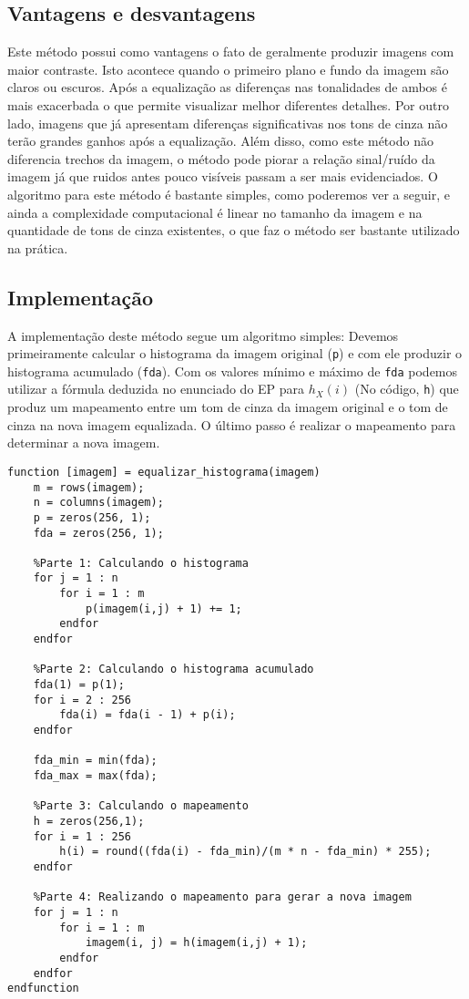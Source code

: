\documentclass[brazil,times]{abnt}
\begin{document}
		\subsection{Vantagens e desvantagens}
			Este método possui como vantagens o fato de geralmente produzir imagens com maior contraste. Isto acontece quando o primeiro plano e fundo da imagem são claros ou escuros. Após a equalização as diferenças nas tonalidades de ambos é mais exacerbada o que permite visualizar melhor diferentes detalhes. Por outro lado, imagens que já apresentam diferenças significativas nos tons de cinza não terão grandes ganhos após a equalização. Além disso, como este método não diferencia trechos da imagem, o método pode piorar a relação sinal/ruído da imagem já que ruidos antes pouco visíveis passam a ser mais evidenciados.
			O algoritmo para este método é bastante simples, como poderemos ver a seguir, e ainda a complexidade computacional é linear no tamanho da imagem e na quantidade de tons de cinza existentes, o que faz o método ser bastante utilizado na prática.
			
		\subsection{Implementação}
			A implementação deste método segue um algoritmo simples: Devemos primeiramente calcular o histograma da imagem original (\texttt{p}) e com ele produzir o histograma acumulado (\texttt{fda}). Com os valores mínimo e máximo de \texttt{fda} podemos utilizar a fórmula deduzida no enunciado do EP para $h_X (i)$ (No código, \texttt{h}) que produz um mapeamento entre um tom de cinza da imagem original e o tom de cinza na nova imagem equalizada. O último passo é realizar o mapeamento para determinar a nova imagem.


\begin{lstlisting}
function [imagem] = equalizar_histograma(imagem)
	m = rows(imagem);
	n = columns(imagem);
	p = zeros(256, 1);
	fda = zeros(256, 1);
	
	%Parte 1: Calculando o histograma
	for j = 1 : n
		for i = 1 : m
			p(imagem(i,j) + 1) += 1;
		endfor
	endfor
	
	%Parte 2: Calculando o histograma acumulado
	fda(1) = p(1);
	for i = 2 : 256
		fda(i) = fda(i - 1) + p(i);
	endfor
	
	fda_min = min(fda);
	fda_max = max(fda);
	
	%Parte 3: Calculando o mapeamento
	h = zeros(256,1);
	for i = 1 : 256
		h(i) = round((fda(i) - fda_min)/(m * n - fda_min) * 255);
	endfor
	
	%Parte 4: Realizando o mapeamento para gerar a nova imagem
	for j = 1 : n
		for i = 1 : m
			imagem(i, j) = h(imagem(i,j) + 1);
		endfor
	endfor
endfunction
\end{lstlisting}
\end{document}
